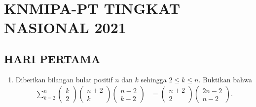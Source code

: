 \documentclass[12pt,twoside]{article}
\begin{document}
\pagebreak

\section{KNMIPA-PT TINGKAT NASIONAL 2021}
\subsection{HARI PERTAMA}
\begin{enumerate}
  \item Diberikan bilangan bulat positif $n$ dan $k$ sehingga $2\leq k\leq n$. Buktikan bahwa
        \begin{align*}
          \sum_{k=2}^n \begin{pmatrix}
                         k \\ 2
                       \end{pmatrix}\begin{pmatrix}
                                      n+2 \\k
                                    \end{pmatrix}
          \begin{pmatrix}
            n-2 \\k-2
          \end{pmatrix} & = \begin{pmatrix}
                              n+2 \\2
                            \end{pmatrix}\begin{pmatrix}
                                           2n-2 \\n-2
                                         \end{pmatrix}.
        \end{align*}


\end{enumerate}
\end{document}
